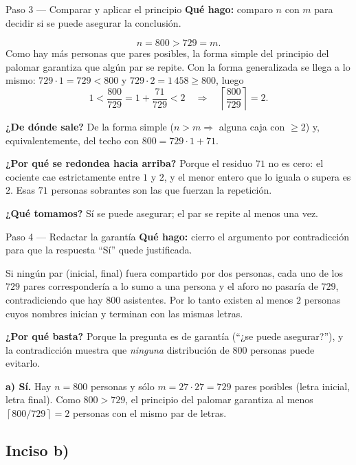 \documentclass[11pt]{article}
\begin{document}
\begin{paso}{Paso 3 --- Comparar y aplicar el principio}
\textbf{Qué hago:} comparo $n$ con $m$ para decidir si se puede asegurar la conclusión.

\[
n=800 > 729 = m .
\]
Como hay más personas que pares posibles, la forma simple del principio del palomar garantiza que algún par se repite. Con la forma generalizada se llega a lo mismo: $729\cdot 1=729<800$ y $729\cdot 2 = 1\,458\ge 800$, luego
\[
1<\frac{800}{729}=1+\frac{71}{729}<2
\quad\Longrightarrow\quad
\left\lceil \frac{800}{729} \right\rceil = 2 .
\]

\textbf{¿De dónde sale?} De la forma simple ($n>m\Rightarrow$ alguna caja con $\ge 2$) y, equivalentemente, del techo con $800=729\cdot 1+71$.

\textbf{¿Por qué se redondea hacia arriba?} Porque el residuo $71$ no es cero: el cociente cae estrictamente entre $1$ y $2$, y el menor entero que lo iguala o supera es $2$. Esas $71$ personas sobrantes son las que fuerzan la repetición.

\textbf{¿Qué tomamos?} Sí se puede asegurar; el par se repite al menos una vez.
\end{paso}

\begin{paso}{Paso 4 --- Redactar la garantía}
\textbf{Qué hago:} cierro el argumento por contradicción para que la respuesta ``Sí'' quede justificada.

Si ningún par (inicial, final) fuera compartido por dos personas, cada uno de los $729$ pares correspondería a lo sumo a una persona y el aforo no pasaría de $729$, contradiciendo que hay $800$ asistentes. Por lo tanto existen al menos $2$ personas cuyos nombres inician y terminan con las mismas letras.

\textbf{¿Por qué basta?} Porque la pregunta es de garantía (``¿se puede asegurar?''), y la contradicción muestra que \emph{ninguna} distribución de $800$ personas puede evitarlo.
\end{paso}

\begin{resp}
\textbf{a) Sí.} Hay $n=800$ personas y sólo $m=27\cdot 27=729$ pares posibles (letra inicial, letra final). Como $800>729$, el principio del palomar garantiza al menos $\left\lceil 800/729\right\rceil=2$ personas con el mismo par de letras.
\end{resp}

\subsection*{Inciso b)}
\end{document}
